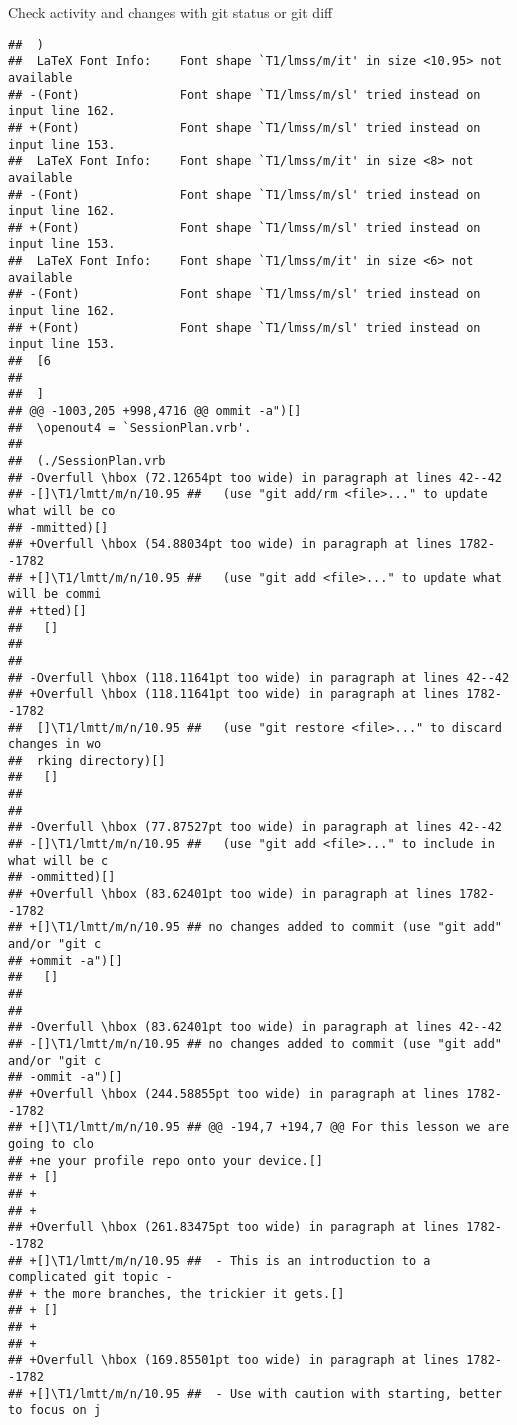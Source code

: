 \documentclass[ignorenonframetext,]{beamer}
\begin{document}
\begin{frame}[fragile]{Check activity and changes with git status or git
diff}
\begin{verbatim}
##  )
##  LaTeX Font Info:    Font shape `T1/lmss/m/it' in size <10.95> not available
## -(Font)              Font shape `T1/lmss/m/sl' tried instead on input line 162.
## +(Font)              Font shape `T1/lmss/m/sl' tried instead on input line 153.
##  LaTeX Font Info:    Font shape `T1/lmss/m/it' in size <8> not available
## -(Font)              Font shape `T1/lmss/m/sl' tried instead on input line 162.
## +(Font)              Font shape `T1/lmss/m/sl' tried instead on input line 153.
##  LaTeX Font Info:    Font shape `T1/lmss/m/it' in size <6> not available
## -(Font)              Font shape `T1/lmss/m/sl' tried instead on input line 162.
## +(Font)              Font shape `T1/lmss/m/sl' tried instead on input line 153.
##  [6
##  
##  ]
## @@ -1003,205 +998,4716 @@ ommit -a")[]
##  \openout4 = `SessionPlan.vrb'.
##  
##  (./SessionPlan.vrb
## -Overfull \hbox (72.12654pt too wide) in paragraph at lines 42--42
## -[]\T1/lmtt/m/n/10.95 ##   (use "git add/rm <file>..." to update what will be co
## -mmitted)[] 
## +Overfull \hbox (54.88034pt too wide) in paragraph at lines 1782--1782
## +[]\T1/lmtt/m/n/10.95 ##   (use "git add <file>..." to update what will be commi
## +tted)[] 
##   []
##  
##  
## -Overfull \hbox (118.11641pt too wide) in paragraph at lines 42--42
## +Overfull \hbox (118.11641pt too wide) in paragraph at lines 1782--1782
##  []\T1/lmtt/m/n/10.95 ##   (use "git restore <file>..." to discard changes in wo
##  rking directory)[] 
##   []
##  
##  
## -Overfull \hbox (77.87527pt too wide) in paragraph at lines 42--42
## -[]\T1/lmtt/m/n/10.95 ##   (use "git add <file>..." to include in what will be c
## -ommitted)[] 
## +Overfull \hbox (83.62401pt too wide) in paragraph at lines 1782--1782
## +[]\T1/lmtt/m/n/10.95 ## no changes added to commit (use "git add" and/or "git c
## +ommit -a")[] 
##   []
##  
##  
## -Overfull \hbox (83.62401pt too wide) in paragraph at lines 42--42
## -[]\T1/lmtt/m/n/10.95 ## no changes added to commit (use "git add" and/or "git c
## -ommit -a")[] 
## +Overfull \hbox (244.58855pt too wide) in paragraph at lines 1782--1782
## +[]\T1/lmtt/m/n/10.95 ## @@ -194,7 +194,7 @@ For this lesson we are going to clo
## +ne your profile repo onto your device.[] 
## + []
## +
## +
## +Overfull \hbox (261.83475pt too wide) in paragraph at lines 1782--1782
## +[]\T1/lmtt/m/n/10.95 ##  - This is an introduction to a complicated git topic -
## + the more branches, the trickier it gets.[] 
## + []
## +
## +
## +Overfull \hbox (169.85501pt too wide) in paragraph at lines 1782--1782
## +[]\T1/lmtt/m/n/10.95 ##  - Use with caution with starting, better to focus on j

\end{verbatim}
\end{frame}
\end{document}
